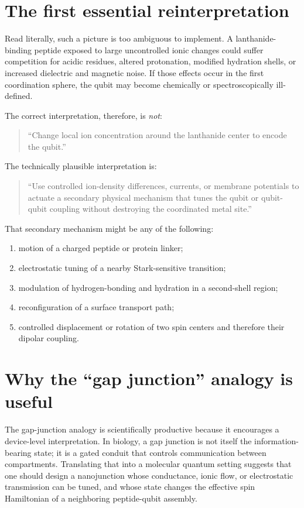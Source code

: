 \documentclass[11pt]{report}
\newcommand{\ham}{Hamiltonian}
\theoremstyle{definition}
\begin{document}
\section{The first essential reinterpretation}
Read literally, such a picture is too ambiguous to implement. A lanthanide-binding peptide exposed to large uncontrolled ionic changes could suffer competition for acidic residues, altered protonation, modified hydration shells, or increased dielectric and magnetic noise. If those effects occur in the first coordination sphere, the qubit may become chemically or spectroscopically ill-defined.

The correct interpretation, therefore, is \emph{not}:
\begin{quote}
``Change local ion concentration around the lanthanide center to encode the qubit.''
\end{quote}

The technically plausible interpretation is:
\begin{quote}
``Use controlled ion-density differences, currents, or membrane potentials to actuate a secondary physical mechanism that tunes the qubit or qubit-qubit coupling without destroying the coordinated metal site.''
\end{quote}

That secondary mechanism might be any of the following:

\begin{enumerate}[leftmargin=2em]
\item motion of a charged peptide or protein linker;
\item electrostatic tuning of a nearby Stark-sensitive transition;
\item modulation of hydrogen-bonding and hydration in a second-shell region;
\item reconfiguration of a surface transport path;
\item controlled displacement or rotation of two spin centers and therefore their dipolar coupling.
\end{enumerate}

\section{Why the ``gap junction'' analogy is useful}
The gap-junction analogy is scientifically productive because it encourages a device-level interpretation. In biology, a gap junction is not itself the information-bearing state; it is a gated conduit that controls communication between compartments. Translating that into a molecular quantum setting suggests that one should design a nanojunction whose conductance, ionic flow, or electrostatic transmission can be tuned, and whose state changes the effective spin \ham{} of a neighboring peptide-qubit assembly.
\end{document}
